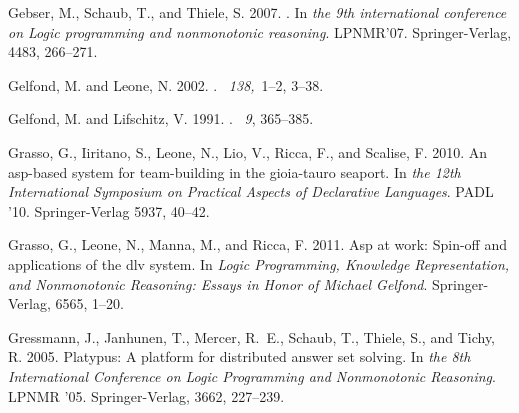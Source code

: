 \documentclass[preprint]{tlp}
\begin{document}
\begin{thebibliography}
{\sc Gebser, M.}, {\sc Schaub, T.}, {\sc and} {\sc Thiele, S.} 2007.
.
\newblock In {\em the 9th international conference on Logic
  programming and nonmonotonic reasoning}. LPNMR'07. Springer-Verlag, 4483, 266--271.

{\sc Gelfond, M.} {\sc and} {\sc Leone, N.} 2002.
.
~{\em 138,\/}~1--2, 3--38.

{\sc Gelfond, M.} {\sc and} {\sc Lifschitz, V.} 1991.
.
~{\em 9}, 365--385.

{\sc Grasso, G.}, {\sc Iiritano, S.}, {\sc Leone, N.}, {\sc Lio, V.}, {\sc
  Ricca, F.}, {\sc and} {\sc Scalise, F.} 2010.
\newblock An asp-based system for team-building in the gioia-tauro seaport.
\newblock In {\em the 12th International Symposium on Practical Aspects of Declarative Languages}.
 PADL '10. Springer-Verlag 5937, 40--42.

{\sc Grasso, G.}, {\sc Leone, N.}, {\sc Manna, M.}, {\sc and} {\sc Ricca, F.}
  2011.
\newblock Asp at work: Spin-off and applications of the dlv system.
\newblock In {\em Logic Programming, Knowledge Representation, and Nonmonotonic
  Reasoning: Essays in Honor of Michael Gelfond}. Springer-Verlag, 6565, 1--20.

{\sc Gressmann, J.}, {\sc Janhunen, T.}, {\sc Mercer, R.~E.}, {\sc Schaub, T.},
  {\sc Thiele, S.}, {\sc and} {\sc Tichy, R.} 2005.
\newblock Platypus: A platform for distributed answer set solving.
\newblock In {\em the 8th International Conference on Logic
  Programming and Nonmonotonic Reasoning}. LPNMR '05. Springer-Verlag, 3662, 227--239.


\end{thebibliography}
\end{document}
